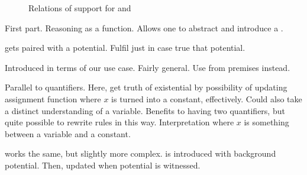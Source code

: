 \begin{note}[Figures]
  \begin{figure}[h]
    \begin{subfigure}{.5\textwidth}
      \centering
      \caption{\AR{}}
    \end{subfigure}
    \begin{subfigure}{.5\textwidth}
      \centering
      \caption{\WR{}}
    \end{subfigure}
    \caption{Relations of support for \AR{} and \WR{}}
  \end{figure}
\end{note}


\begin{note}
  First part.
  Reasoning as a function.
  Allows one to abstract and introduce a \future{}.

  \future{} gets paired with a potential.
  Fulfil \future{} just in case true that potential.

  Introduced in terms of our use case.
  Fairly general.
  Use from premises instead.

  Parallel to quantifiers.
  Here, get truth of existential by possibility of updating assignment function where \(x\) is turned into a constant, effectively.
  Could also take a distinct understanding of a variable.
  Benefits to having two quantifiers, but quite possible to rewrite rules in this way.
  Interpretation where \(x\) is something between a variable and a constant.

  \future{} works the same, but slightly more complex.
  \future{} is introduced with background potential.
  Then, updated when potential is witnessed.

\end{note}





